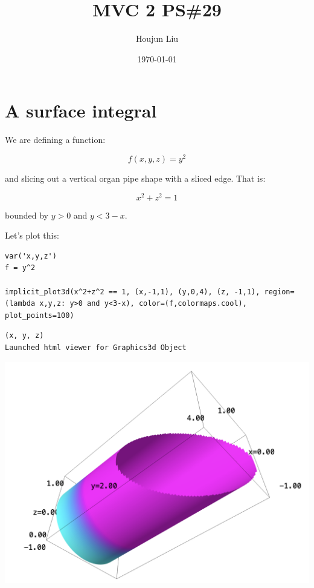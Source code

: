 \documentclass[letterpaper]{article}
\author{Houjun Liu}
\date{\today}
\title{MVC 2 PS\#29}
\renewcommand{\tableofcontents}{}
\renewcommand\maketitle{}
\begin{document}
\maketitle
\tableofcontents


\section{A surface integral}
\label{sec:org0b433ae}
We are defining a function:

\begin{equation}
   f(x,y,z) = y^2 
\end{equation}

and slicing out a vertical organ pipe shape with a sliced edge. That is:

\begin{equation}
   x^2 + z^2 = 1 
\end{equation}

bounded by \(y>0\) and \(y<3-x\).

Let's plot this:

\begin{verbatim}
var('x,y,z')
f = y^2

implicit_plot3d(x^2+z^2 == 1, (x,-1,1), (y,0,4), (z, -1,1), region=(lambda x,y,z: y>0 and y<3-x), color=(f,colormaps.cool), plot_points=100)
\end{verbatim}

\begin{verbatim}
(x, y, z)
Launched html viewer for Graphics3d Object
\end{verbatim}


\begin{center}
\includegraphics[width=.9\linewidth]{2022-05-23_10-16-40_screenshot.png}
\end{center}
\end{document}
